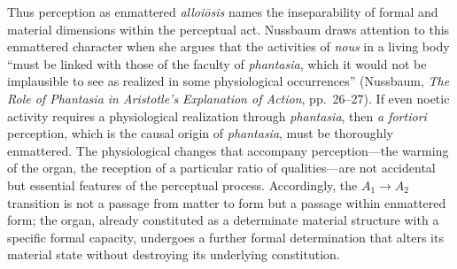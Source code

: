 \documentclass[12pt]{article}
\begin{document}
Thus perception as enmattered \textit{alloiōsis} names the inseparability of formal and material dimensions within the perceptual act. Nussbaum draws attention to this enmattered character when she argues that the activities of \textit{nous} in a living body ``must be linked with those of the faculty of \textit{phantasia}, which it would not be implausible to see as realized in some physiological occurrences'' (Nussbaum, \textit{The Role of Phantasia in Aristotle's Explanation of Action}, pp.~26--27). If even noetic activity requires a physiological realization through \textit{phantasia}, then \textit{a fortiori} perception, which is the causal origin of \textit{phantasia}, must be thoroughly enmattered. The physiological changes that accompany perception---the warming of the organ, the reception of a particular ratio of qualities---are not accidental but essential features of the perceptual process. Accordingly, the $A_1 \to A_2$ transition is not a passage from matter to form but a passage within enmattered form; the organ, already constituted as a determinate material structure with a specific formal capacity, undergoes a further formal determination that alters its material state without destroying its underlying constitution.
\end{document}

